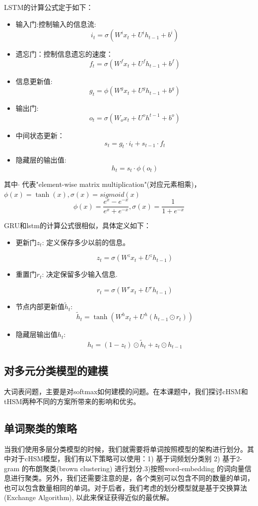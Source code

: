 \documentclass[12pt,a4paper]{article}
\begin{document}
LSTM的计算公式定于如下：
\begin{itemize}
\item 输入门:控制输入的信息流:
$$i_t=\sigma(W^i x_t+U^i h_{t-1}+b^i)$$
\item  遗忘门：控制信息遗忘的速度：
$$f_t=\sigma(W^f x_t+U^f h_{t-1}+b^f)$$
\item  信息更新值:
$$g_t=\phi(W^g x_t+U^g h_{t-1}+b^g)$$
\item  输出门:
$$o_t=\sigma(W_o x_t+U^o h^{t-1}+b^o)$$
\item  中间状态更新：
$$s_t=g_t\cdot i_t+s_{t-1}\cdot f_t$$
\item  隐藏层的输出值:
$$h_t=s_t\cdot \phi(o_t)$$
\end{itemize}
其中$\cdot$ 代表"element-wise matrix multiplication"(对应元素相乘)，$\phi(x)=\tanh(x),\sigma(x)=sigmoid(x)$
$$\phi(x)=\frac{e^x-e^{-x}}{e^x+e^{-x}},\sigma(x)=\frac{1}{1+e^{-x}}$$

GRU和lstm的计算公式很相似，具体定义如下：
\begin{itemize}
\item 更新门$z_t$: 定义保存多少以前的信息。

\[z_t = \sigma ( W^z x_t+ U^z h_{t-1}  )\]

\item 重置门$r_t$: 决定保留多少输入信息.

\[r_t = \sigma(W^r x_t  + U^r h_{t-1}  )\]

\item 节点内部更新值$\tilde h_t $:
 \[\tilde h_t  = \tanh (W^h x_t  + U^h(h_{t-1} \odot r_t) )\]

\item 隐藏层输出值$h_t$:
\[h_t = (1-z_t)\odot \tilde h_t  + z_t \odot h_{t-1}\]
\end{itemize}

\subsection{对多元分类模型的建模}
大词表问题，主要是对softmax如何建模的问题。在本课题中，我们探讨cHSM和tHSM两种不同的方案所带来的影响和优劣。
\subsection{单词聚类的策略}
当我们使用多层分类模型的时候，我们就需要将单词按照模型的架构进行划分。其中对于cHSM模型，我们有以下策略可以使用：1) 基于词频划分类别 2) 基于2-gram 的布朗聚类(brown clustering) 进行划分.3)按照word-embedding 的词向量信息进行聚类。另外，我们还需要注意的是，各个类别可以包含不同的数量的单词，也可以包含数量相同的单词。对于后者，我们考虑的划分模型就是基于交换算法(Exchange Algorithm), 以此来保证获得近似的最优解。
\end{document}
